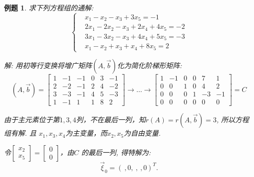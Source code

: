\documentclass[a4paper]{book}
\newtheorem{eg}{例题}[chapter]
\begin{document}
\begin{eg}
求下列方程组的通解:
\begin{displaymath}\left\{\begin{aligned}
&x_1-x_2-x_3+3x_5=-1\\
&2x_1-2x_2-x_3+2x_4+4x_5=-2\\
&3x_1-3x_2-x_3+4x_4+5x_5=-3\\
&x_1-x_2+x_3+x_4+8x_5=2\end{aligned}\right.\end{displaymath}

解: 用初等行变换将增广矩阵$(A, \vec{b})$化为简化阶梯形矩阵:
\begin{displaymath}
(A,\vec{b})=\begin{bmatrix}1&-1&-1&0&3&-1\\2&-2&-1&2&4&-2\\3&-3&-1&4&5&-3\\1&-1&
1&1&8&2\end{bmatrix}\rightarrow\dots\rightarrow\begin{bmatrix}1&-1&0&0&7&1\\0&0&
1&0&4&2\\0&0&0&1&-3&-1\\0&0&0&0&0&0\end{bmatrix}=C
\end{displaymath}

由于主元素位于第$1,3,4$列，不在最后一列，知$r(A) = r(A, \vec{b}) = 3$,  所以方程组有解. 且 $x_1, x_3, x_4$为主变量，而$x_2, x_5$为自由变量.

令$\begin{bmatrix}x_2\\ x_5\end{bmatrix}=\begin{bmatrix}0\\0\end{bmatrix}$，由$C$ 的最后一列, 得特解为:
\begin{displaymath}
\vec{\xi}_0=(\ ,0,\ ,\ ,0)^T.
\end{displaymath}


\end{eg}
\end{document}
